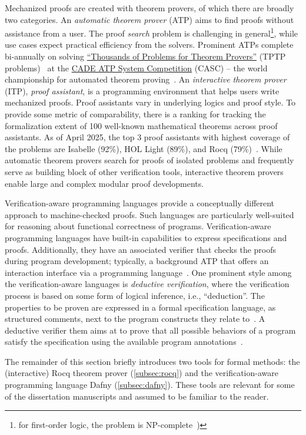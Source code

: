 Mechanized proofs are created with theorem provers, of which there are broadly two categories.
An \emph{automatic theorem prover} (ATP) aims to find proofs without assistance from a user.
The proof \emph{search} problem is challenging in general\footnote{\Eg for first-order logic, the problem is NP-complete~\cite{cook1971, levin1973})}, while use cases expect practical efficiency from the solvers.
Prominent ATPs complete bi-annually on solving \href{https://www.tptp.org/}{\enquote{Thousands of Problems for Theorem Provers}} (TPTP problems)~\cite{sutcliffe2024} at the \href{https://tptp.org/CASC/}{CADE ATP System Competition} (CASC) --
the world championship for automated theorem proving~\cite{casc}.
An \emph{interactive theorem prover} (ITP), \aka \emph{proof assistant}, is a programming environment that helps users write mechanized proofs.
Proof assistants vary in underlying logics and proof style.
To provide some metric of comparability, there is a ranking for tracking the formalization extent of 100 well-known mathematical theorems across proof assistants.
As of April 2025, the top 3 proof assistants with highest coverage of the problems are Isabelle (92\%), HOL Light (89\%), and Rocq (79\%)~\cite{hundredtheorems}.
While automatic theorem provers search for proofs of isolated problems and frequently serve as building block of other verification tools,
interactive theorem provers enable large and complex modular proof developments.

Verification-aware programming languages provide a conceptually different approach to machine-checked proofs.
Such languages are particularly well-suited for reasoning about functional correctness of programs.
Verification-aware programming languages have built-in capabilities to express specifications and proofs.
Additionally, they have an associated verifier that checks the proofs during program development;
typically, a background ATP that offers an interaction interface via a programming language~\cite{leino2023}.
One prominent style among the verification-aware languages is \emph{deductive verification},
where the verification process is based on some form of logical inference, i.e., \enquote{deduction}.
The properties to be proven are expressed in a formal specification language, as structured comments, next to the program constructs they relate to~\cite{hahnle2019}.
A deductive verifier them aims at to prove that all possible behaviors of a program satisfy the specification using the available program annotations~\cite{cassez2022}.

The remainder of this section briefly introduces two tools for formal methods:
the (interactive) Rocq theorem prover (\autoref{subsec:rocq}) and the verification-aware programming language Dafny (\autoref{subsec:dafny}).
These tools are relevant for some of the dissertation manuscripts and assumed to be familiar to the reader.


